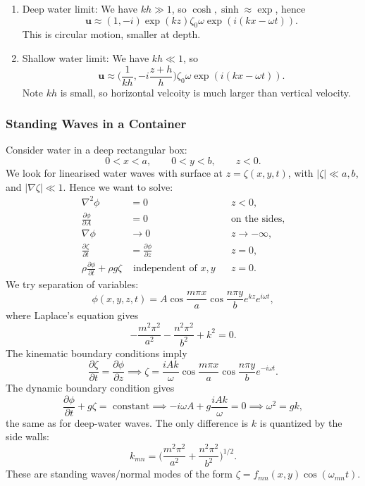 \documentclass[12pt]{article}
\begin{document}
\begin{enumerate}
	\item Deep water limit: We have $kh \gg 1$, so $\cosh, \sinh \approx \exp$, hence
		\[
			\mathbf{u} \approx (1, -i) \exp(kz) \zeta_0 \omega \exp(i(kx - \omega t)).
		\]
		This is circular motion, smaller at depth.
	\item Shallow water limit: We have $kh \ll 1$, so
		\[
		\mathbf{u} \approx \biggl( \frac{1}{kh}, -i \frac{z+h}{h} \biggr) \zeta_0 \omega \exp(i(kx - \omega t)).
		\]
		Note $kh$ is small, so horizontal velcoity is much larger than vertical velocity.
\end{enumerate}

\subsubsection{Standing Waves in a Container}
\label{subsub:standing_waves_in_a_container}

Consider water in a deep rectangular box:
\[
0 < x < a, \qquad 0 < y < b, \qquad z < 0.
\]
We look for linearised water waves with surface at $z = \zeta(x, y, t)$, with $|\zeta| \ll a, b$, and $|\nabla \zeta| \ll 1$. Hence we want to solve:
\begin{align*}
	\nabla^2 \phi &= 0 & &z<0, \\
	\frac{\partial \phi}{\partial A} &= 0 & &\text{on the sides},\\
	\nabla \phi &\to 0 & &z \to -\infty, \\
	\frac{\partial \zeta}{\partial t} &= \frac{\partial \phi}{\partial z} & &z = 0,\\
	\rho \frac{\partial \phi}{\partial t} + \rho g \zeta &\text{ independent of } x, y & &z = 0.
\end{align*}
We try separation of variables:
\[
\phi(x, y, z, t) = A \cos \frac{m \pi x}{a} \cos \frac{n \pi y}{b} e^{kz} e^{i \omega t},
\]
where Laplace's equation gives
\[
- \frac{m^2 \pi^2}{a^2} - \frac{n^2 \pi^2}{b^2} + k^2 = 0.
\]
The kinematic boundary conditions imply
\[
\frac{\partial \zeta}{\partial t} = \frac{\partial \phi}{\partial z} \implies \zeta = \frac{iAk}{\omega} \cos \frac{m \pi x}{a} \cos \frac{n \pi y}{b} e^{-i \omega t}.
\]
The dynamic boundary condition gives
\[
	\frac{\partial \phi}{\partial t} + g \zeta = \text{ constant} \implies -i \omega A + g\frac{i A k}{\omega} = 0 \implies \omega^2 = gk,
\]
the same as for deep-water waves. The only difference is $k$ is quantized by the side walls:
\[
k_{mn} = \biggl( \frac{m^2 \pi^2}{a^2} + \frac{n^2 \pi^2}{b^2} \biggr)^{1/2}.
\]
These are standing waves/normal modes of the form $\zeta = f_{mn}(x, y) \cos(\omega_{mn} t)$.
\end{document}
